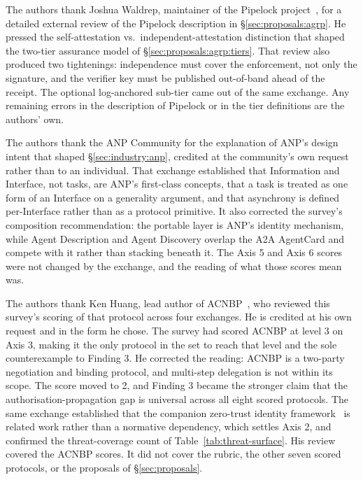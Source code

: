 \begin{acks}
The authors thank Joshua Waldrep, maintainer
of the Pipelock project~\cite{pipelock}, for a detailed
external review of the Pipelock description in
\S\ref{sec:proposals:agrp}. He pressed the
self-attestation vs.\ independent-attestation
distinction that shaped the two-tier assurance model of
\S\ref{sec:proposals:agrp:tiers}. That review also
produced two tightenings: independence must cover the
enforcement, not only the signature, and the verifier key
must be published out-of-band ahead of the receipt. The
optional log-anchored sub-tier came out of the same
exchange. Any remaining errors in
the description of Pipelock or in the tier definitions
are the authors' own.

The authors thank the ANP Community for the explanation of
ANP's design intent that shaped
\S\ref{sec:industry:anp}, credited at the community's own
request rather than to an individual. That exchange
established that Information and Interface, not tasks, are
ANP's first-class concepts, that a task is treated as one
form of an Interface on a generality argument, and that
asynchrony is defined per-Interface rather than as a
protocol primitive. It also corrected the survey's
composition recommendation: the portable layer is ANP's
identity mechanism, while Agent Description and Agent
Discovery overlap the A2A AgentCard and compete with it
rather than stacking beneath it. The Axis 5 and Axis 6
scores were not changed by the exchange, and the reading of
what those scores mean was.

The authors thank Ken Huang, lead author of
ACNBP~\cite{spec_acnbp}, who reviewed this survey's scoring
of that protocol across four exchanges. He is credited at his
own request and in the form he chose. The survey had scored
ACNBP at level 3 on Axis 3, making it the only protocol in
the set to reach that level and the sole counterexample to
Finding 3. He corrected the reading: ACNBP is a two-party
negotiation and binding protocol, and multi-step delegation
is not within its scope. The score moved to 2, and Finding 3
became the stronger claim that the authorisation-propagation
gap is universal across all eight scored protocols. The same
exchange established that the companion zero-trust identity
framework~\cite{huang_zerotrust_identity} is related work
rather than a normative dependency, which settles Axis 2,
and confirmed the threat-coverage count of
Table~\ref{tab:threat-surface}. His review covered the ACNBP
scores. It did not cover the rubric, the other seven scored
protocols, or the proposals of
\S\ref{sec:proposals}.


\end{acks}
